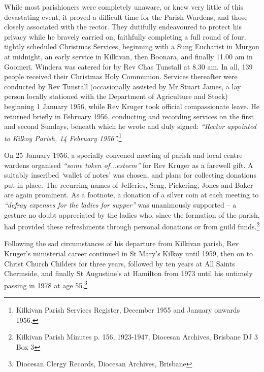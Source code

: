 While most parishioners were completely unaware, or knew very little of this devastating event, it proved a difficult time for the Parish Wardens, and those closely associated with the rector. They dutifully endeavoured to protect his privacy while he bravely carried on, faithfully completing a full round of four, tightly scheduled Christmas Services, beginning with a Sung Eucharist in Murgon at midnight, an early service in Kilkivan, then Boonara, and finally 11.00 am in Goomeri. Windera was catered for by Rev Chas Tunstall at 8.30 am. In all, 139 people received their Christmas Holy Communion. Services thereafter were conducted by Rev Tunstall (occasionally assisted by Mr Stuart James, a lay person locally stationed with the Department of Agriculture and Stock) beginning 1 January 1956, while Rev Kruger took official compassionate leave. He returned briefly in February 1956, conducting and recording services on the first and second Sundays, beneath which he wrote and duly signed: \emph{``Rector appointed to Kilkoy Parish, 14 February 1956''.}\footnote{Kilkivan Parish Services Register, December 1955 and January onwards 1956.}


On 25 January 1956, a specially convened meeting of parish and local centre wardens organised \emph{``some token of...esteem''} for Rev Kruger as a farewell gift. A suitably inscribed \emph{`}wallet of notes' was chosen, and plans for collecting donations put in place. The recurring names of Jefferies, Seng, Pickering, Jones and Baker are again prominent. As a footnote, a donation of a silver coin at each meeting to \emph{``defray expenses for the ladies for supper''} was unanimously supported -- a gesture no doubt appreciated by the ladies who, since the formation of the parish, had provided these refreshments through personal donations or from guild funds.\footnote{Kilkivan Parish Minutes p. 156, 1923-1947, Diocesan Archives, Brisbane DJ 3 Box 3}


Following the sad circumstances of his departure from Kilkivan parish, Rev Kruger's ministerial career continued in St Mary's Kilkoy until 1959, then on to Christ Church Childers for three years, followed by ten years at All Saints Chermside, and finally St Augustine's at Hamilton from 1973 until his untimely passing in 1978 at age 55.\footnote{Diocesan Clergy Records, Diocesan Archives, Brisbane}


